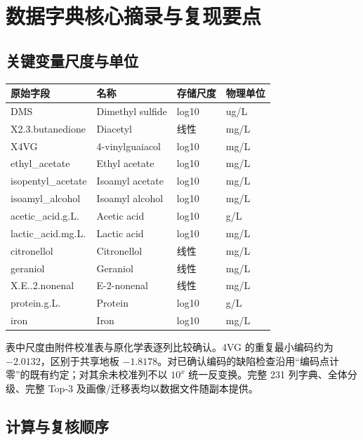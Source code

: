 \documentclass[
  chinese,
  11pt,
]{article}
\newcounter{none} %
\begin{document}
\newpage

\section{数据字典核心摘录与复现要点}\label{ux6570ux636eux5b57ux5178ux6838ux5fc3ux6458ux5f55ux4e0eux590dux73b0ux8981ux70b9}

\subsection{关键变量尺度与单位}\label{ux5173ux952eux53d8ux91cfux5c3aux5ea6ux4e0eux5355ux4f4d}

{\def\LTcaptype{none} %
\begin{longtable}[]{@{}llll@{}}
\toprule\noalign{}
原始字段 & 名称 & 存储尺度 & 物理单位 \\
\midrule\noalign{}
\endhead
\bottomrule\noalign{}
\endlastfoot
DMS & Dimethyl sulfide & log10 & ug/L \\
X2.3.butanedione & Diacetyl & 线性 & mg/L \\
X4VG & 4-vinylguaiacol & log10 & mg/L \\
ethyl\_acetate & Ethyl acetate & log10 & mg/L \\
isopentyl\_acetate & Isoamyl acetate & log10 & mg/L \\
isoamyl\_alcohol & Isoamyl alcohol & log10 & mg/L \\
acetic\_acid.g.L. & Acetic acid & log10 & g/L \\
lactic\_acid.mg.L. & Lactic acid & log10 & mg/L \\
citronellol & Citronellol & 线性 & mg/L \\
geraniol & Geraniol & 线性 & mg/L \\
X.E..2.nonenal & E-2-nonenal & 线性 & mg/L \\
protein.g.L. & Protein & log10 & g/L \\
iron & Iron & log10 & mg/L \\
\end{longtable}
}

表中尺度由附件校准表与原化学表逐列比较确认。4VG 的重复最小编码约为
\(-2.0132\)，区别于共享地板
\(-1.8178\)。对已确认编码的缺陷检查沿用``编码点计零''的既有约定；对其余未校准列不以
\(10^x\) 统一反变换。完整 231 列字典、全体分级、完整 Top-3
及画像/迁移表均以数据文件随副本提供。

\subsection{计算与复核顺序}\label{ux8ba1ux7b97ux4e0eux590dux6838ux987aux5e8f}
\end{document}
